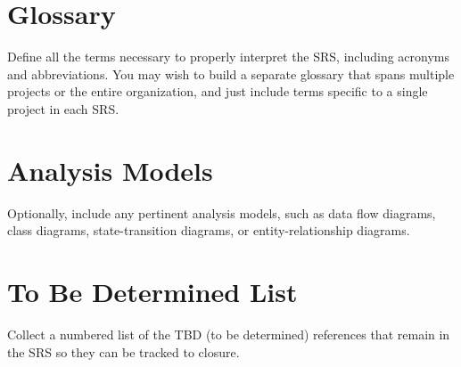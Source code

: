\documentclass[a4paper,10pt]{article}
\begin{document}
\begin{appendices}
\section{Glossary}
Define all the terms necessary to properly interpret the SRS, including acronyms and abbreviations. You may wish to build a separate glossary that spans multiple projects or the entire organization, and just include terms specific to a single project in each SRS.
\section{Analysis Models}
Optionally, include any pertinent analysis models, such as data flow diagrams, class diagrams, state-transition diagrams, or entity-relationship diagrams.
\section{To Be Determined List}
Collect a numbered list of the TBD (to be determined) references that remain in the SRS so they can be tracked to closure.
\end{appendices}

\printbibliography[title=references]
\end{document}
